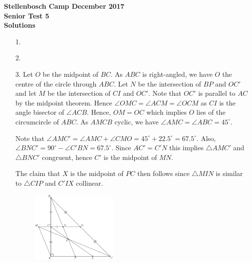 \documentclass[a4paper, 12pt]{article}
\begin{document}
\begin{center}
\textbf{Stellenbosch Camp December 2017 \\ Senior Test 5} \\
\textbf{Solutions}
\end{center}


\begin{enumerate}

    \item[1.] 
    
    
    \item[2.] 
    
    
    \item[3.] Let $O$ be the midpoint of $BC$. As $ABC$ is right-angled, we have $O$ the centre of the circle through $ABC$. Let $N$ be the intersection of $BP$ and $OC'$ and let $M$ be the intersection of $CI$ and $OC'$. Note that $OC'$ is parallel to $AC$ by the midpoint theorem. Hence $\angle OMC = \angle ACM = \angle OCM$ as $CI$ is the angle bisector of $\angle ACB$. Hence, $OM = OC$ which implies $O$ lies of the circumcircle of $ABC$. As $AMCB$ cyclic, we have $\angle AMC = \angle ABC = 45^\circ$.
    
    Note that $\angle AMC' = \angle AMC + \angle CMO = 45^\circ + 22.5^\circ = 67.5^\circ$. Also, $\angle BNC' = 90^\circ - \angle C'BN = 67.5^\circ$. Since $AC' = C'N$ this implies $\triangle AMC'$ and $\triangle BNC'$ congruent, hence $C'$ is the midpoint of $MN$.
    
    The claim that $X$ is the midpoint of $PC$ then follows since $\triangle MIN$ is similar to $\triangle CIP$ and $C'IX$ collinear.
        
    \begin{figure}[h!]
        \centering
        \includegraphics[width=0.4\textwidth]{seniortest5_q3.pdf}
    \end{figure}
    


\end{enumerate}
\end{document}
